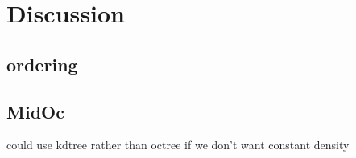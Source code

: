 

 \section{Discussion}
 
 \subsection{ordering}
 \subsection{MidOc}
 	could use kdtree rather than octree if we don't want constant density